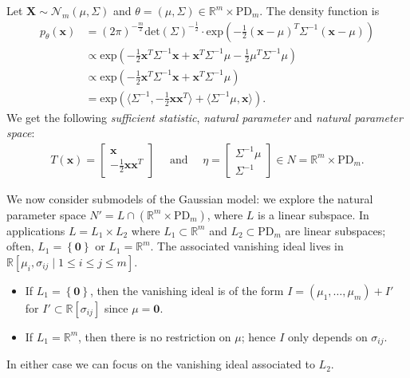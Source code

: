 Let \( \mathbf X \sim \mathcal{N}_{m}(\mu, \Sigma) \) and \( \theta = (\mu, \Sigma) \in \mathbb{R}^m \times \mathrm{PD}_m \). The density function is
\begin{align*}
  p_\theta(\mathbf x) &= (2\pi)^{-\frac{m}{2}}\mathrm{det}(\Sigma)^{-\frac{1}{2}} \cdot \mathrm{exp}\left( -\frac{1}{2} (\mathbf x - \mu)^T\Sigma^{-1}(\mathbf x- \mu) \right) \\
  &\propto \mathrm{exp}\left( -\frac{1}{2}\mathbf x^T \Sigma^{-1}\mathbf x + \mathbf x^T \Sigma^{-1}\mu - \frac{1}{2}\mu^T\Sigma^{-1}\mu \right) \\
  &\propto \mathrm{exp}\left( -\frac{1}{2}\mathbf x^T \Sigma^{-1}\mathbf x + \mathbf x^T \Sigma^{-1}\mu  \right) \\
  &= \mathrm{exp}\left( \langle \Sigma^{-1},-\frac{1}{2} \mathbf x \mathbf x^T \rangle + \langle \Sigma^{-1}\mu, \mathbf x \rangle \right).
\end{align*}
We get the following \emph{sufficient statistic}, \emph{natural parameter} and \emph{natural parameter space}: 
\begin{align*}
  T(\mathbf x) = \begin{bmatrix}
    \mathbf x \\ -\frac{1}{2}\mathbf x \mathbf x^T
  \end{bmatrix} \quad \text{ and } \quad 
  \eta = \begin{bmatrix}
    \Sigma^{-1}\mu \\ \Sigma^{-1}
  \end{bmatrix} \in N = \mathbb{R}^m \times \mathrm{PD}_m.
\end{align*}


We now consider submodels of the Gaussian model: we explore the natural parameter space \( N' = L \cap (\mathbb{R}^m \times \mathrm{PD}_m) \), where \( L \) is a linear subspace. In applications \( L = L_1 \times L_2 \) where \( L_1 \subset \mathbb{R}^m \) and \( L_2 \subset \mathrm{PD}_m \) are linear subspaces; often, \( L_1 = \left\{ \mathbf 0 \right\} \) or \( L_1 = \mathbb R^m \). The associated vanishing ideal lives in \( \mathbb R[\mu_i, \sigma_{ij} \mid 1 \leq i \leq j \leq m] \).
\begin{itemize}
  \item If \( L_1 = \left\{ \mathbf 0 \right\} \), then the vanishing ideal is of the form \( I = (\mu_1, \dots, \mu_m) + I' \) for \( I' \subset \mathbb{R}[\sigma_{ij}] \) since \( \mu = \mathbf 0 \).
  \item If \( L_1 = \mathbb R^m \), then there is no restriction on \( \mu \); hence \( I \) only depends on \( \sigma_{ij} \).
\end{itemize}
In either case we can focus on the vanishing ideal associated to \( L_2 \).

